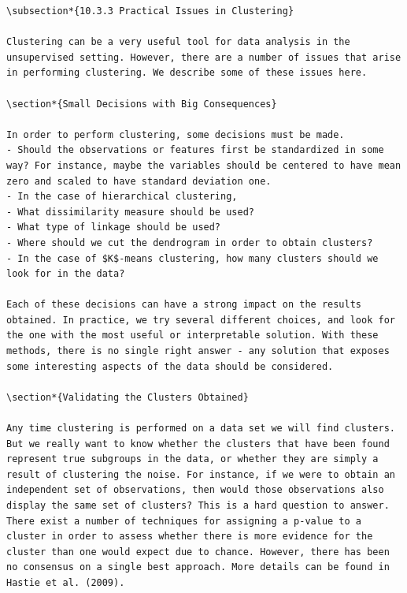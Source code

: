 \documentclass[10pt]{article}
\begin{document}
\begin{verbatim}
\subsection*{10.3.3 Practical Issues in Clustering}

Clustering can be a very useful tool for data analysis in the unsupervised setting. However, there are a number of issues that arise in performing clustering. We describe some of these issues here.

\section*{Small Decisions with Big Consequences}

In order to perform clustering, some decisions must be made.
- Should the observations or features first be standardized in some way? For instance, maybe the variables should be centered to have mean zero and scaled to have standard deviation one.
- In the case of hierarchical clustering,
- What dissimilarity measure should be used?
- What type of linkage should be used?
- Where should we cut the dendrogram in order to obtain clusters?
- In the case of $K$-means clustering, how many clusters should we look for in the data?

Each of these decisions can have a strong impact on the results obtained. In practice, we try several different choices, and look for the one with the most useful or interpretable solution. With these methods, there is no single right answer - any solution that exposes some interesting aspects of the data should be considered.

\section*{Validating the Clusters Obtained}

Any time clustering is performed on a data set we will find clusters. But we really want to know whether the clusters that have been found represent true subgroups in the data, or whether they are simply a result of clustering the noise. For instance, if we were to obtain an independent set of observations, then would those observations also display the same set of clusters? This is a hard question to answer. There exist a number of techniques for assigning a p-value to a cluster in order to assess whether there is more evidence for the cluster than one would expect due to chance. However, there has been no consensus on a single best approach. More details can be found in Hastie et al. (2009).


\end{verbatim}
\end{document}

